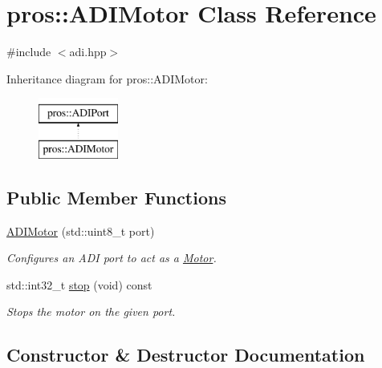 \hypertarget{classpros_1_1ADIMotor}{}\section{pros\+:\+:A\+D\+I\+Motor Class Reference}
\label{classpros_1_1ADIMotor}


{\ttfamily \#include $<$adi.\+hpp$>$}

Inheritance diagram for pros\+:\+:A\+D\+I\+Motor\+:\begin{figure}[H]
\begin{center}
\leavevmode
\includegraphics[height=2.000000cm]{classpros_1_1ADIMotor}
\end{center}
\end{figure}
\subsection*{Public Member Functions}
\begin{DoxyCompactItemize}
\item 
\hyperlink{classpros_1_1ADIMotor_afd2da0e8c53a8bc0c999d5232242069a}{A\+D\+I\+Motor} (std\+::uint8\+\_\+t port)
\begin{DoxyCompactList}\small\item\em Configures an A\+DI port to act as a \hyperlink{classpros_1_1Motor}{Motor}. \end{DoxyCompactList}\item 
std\+::int32\+\_\+t \hyperlink{classpros_1_1ADIMotor_ad8e9be8dfbc022e893a4d15996fe3bcd}{stop} (void) const
\begin{DoxyCompactList}\small\item\em Stops the motor on the given port. \end{DoxyCompactList}\end{DoxyCompactItemize}


\subsection{Constructor \& Destructor Documentation}
\mbox{\label{classpros_1_1ADIMotor_afd2da0e8c53a8bc0c999d5232242069a}} 
